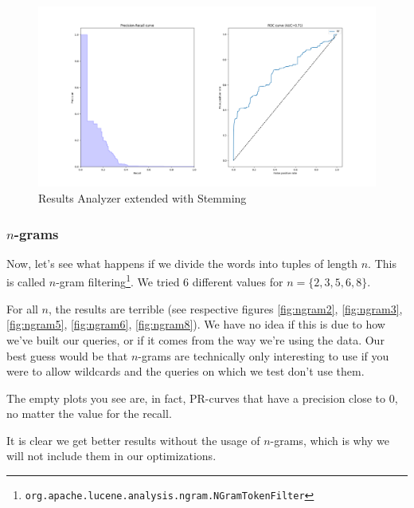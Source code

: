 \documentclass[11pt]{article}
\begin{document}
\begin{figure}[h!]
    \centering
    \includegraphics[width=\textwidth]{images/customAna-stem}
    \caption{Results Analyzer extended with Stemming}
    \label{fig:stemming}
\end{figure}

\subsubsection{$n$-grams}\label{sec:ngrams}
Now, let's see what happens if we divide the words into tuples of length $n$. This is called $n$-gram filtering\footnote{\texttt{org.apache.lucene.analysis.ngram.NGramTokenFilter}}. We tried 6 different values for $n = \{2, 3, 5, 6, 8\}$.

For all $n$, the results are terrible (see respective figures \ref{fig:ngram2}, \ref{fig:ngram3}, \ref{fig:ngram5}, \ref{fig:ngram6}, \ref{fig:ngram8}). We have no idea if this is due to how we've built our queries, or if it comes from the way we're using the data. Our best guess would be that $n$-grams are technically only interesting to use if you were to allow wildcards and the queries on which we test don't use them.

The empty plots you see are, in fact, PR-curves that have a precision close to 0, no matter the value for the recall.

It is clear we get better results without the usage of $n$-grams, which is why we will not include them in our optimizations.
\end{document}
